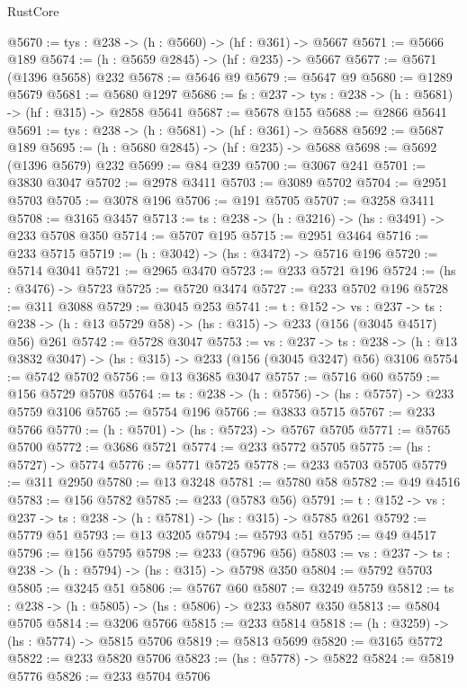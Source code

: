 \begin{lexlean}{RustCore}
\begin{coremodule}
@5670 := {tys : @238} -> (h : @5660) -> (hf : @361) -> @5667
@5671 := @5666 @189
@5674 := (h : @5659 @2845) -> (hf : @235) -> @5667
@5677 := @5671 (@1396 @5658) @232
@5678 := @5646 @9
@5679 := @5647 @9
@5680 := @1289 @5679
@5681 := @5680 @1297
@5686 := {fs : @237} -> {tys : @238} -> (h : @5681) -> (hf : @315) -> @2858 @5641
@5687 := @5678 @155
@5688 := @2866 @5641
@5691 := {tys : @238} -> (h : @5681) -> (hf : @361) -> @5688
@5692 := @5687 @189
@5695 := (h : @5680 @2845) -> (hf : @235) -> @5688
@5698 := @5692 (@1396 @5679) @232
@5699 := @84 @239
@5700 := @3067 @241
@5701 := @3830 @3047
@5702 := @2978 @3411
@5703 := @3089 @5702
@5704 := @2951 @5703
@5705 := @3078 @196
@5706 := @191 @5705
@5707 := @3258 @3411
@5708 := @3165 @3457
@5713 := {ts : @238} -> (h : @3216) -> (hs : @3491) -> @233 @5708 @350
@5714 := @5707 @195
@5715 := @2951 @3464
@5716 := @233 @5715
@5719 := (h : @3042) -> (hs : @3472) -> @5716 @196
@5720 := @5714 @3041
@5721 := @2965 @3470
@5723 := @233 @5721 @196
@5724 := (hs : @3476) -> @5723
@5725 := @5720 @3474
@5727 := @233 @5702 @196
@5728 := @311 @3088
@5729 := @3045 @253
@5741 := {t : @152} ->
  {vs : @237} ->
  {ts : @238} -> (h : @13 @5729 @58) -> (hs : @315) -> @233 (@156 (@3045 @4517) @56) @261
@5742 := @5728 @3047
@5753 := {vs : @237} ->
  {ts : @238} -> (h : @13 @3832 @3047) -> (hs : @315) -> @233 (@156 (@3045 @3247) @56) @3106
@5754 := @5742 @5702
@5756 := @13 @3685 @3047
@5757 := @5716 @60
@5759 := @156 @5729 @5708
@5764 := {ts : @238} -> (h : @5756) -> (hs : @5757) -> @233 @5759 @3106
@5765 := @5754 @196
@5766 := @3833 @5715
@5767 := @233 @5766
@5770 := (h : @5701) -> (hs : @5723) -> @5767 @5705
@5771 := @5765 @5700
@5772 := @3686 @5721
@5774 := @233 @5772 @5705
@5775 := (hs : @5727) -> @5774
@5776 := @5771 @5725
@5778 := @233 @5703 @5705
@5779 := @311 @2950
@5780 := @13 @3248
@5781 := @5780 @58
@5782 := @49 @4516
@5783 := @156 @5782
@5785 := @233 (@5783 @56)
@5791 := {t : @152} -> {vs : @237} -> {ts : @238} -> (h : @5781) -> (hs : @315) -> @5785 @261
@5792 := @5779 @51
@5793 := @13 @3205
@5794 := @5793 @51
@5795 := @49 @4517
@5796 := @156 @5795
@5798 := @233 (@5796 @56)
@5803 := {vs : @237} -> {ts : @238} -> (h : @5794) -> (hs : @315) -> @5798 @350
@5804 := @5792 @5703
@5805 := @3245 @51
@5806 := @5767 @60
@5807 := @3249 @5759
@5812 := {ts : @238} -> (h : @5805) -> (hs : @5806) -> @233 @5807 @350
@5813 := @5804 @5705
@5814 := @3206 @5766
@5815 := @233 @5814
@5818 := (h : @3259) -> (hs : @5774) -> @5815 @5706
@5819 := @5813 @5699
@5820 := @3165 @5772
@5822 := @233 @5820 @5706
@5823 := (hs : @5778) -> @5822
@5824 := @5819 @5776
@5826 := @233 @5704 @5706

\end{coremodule}
\end{lexlean}

